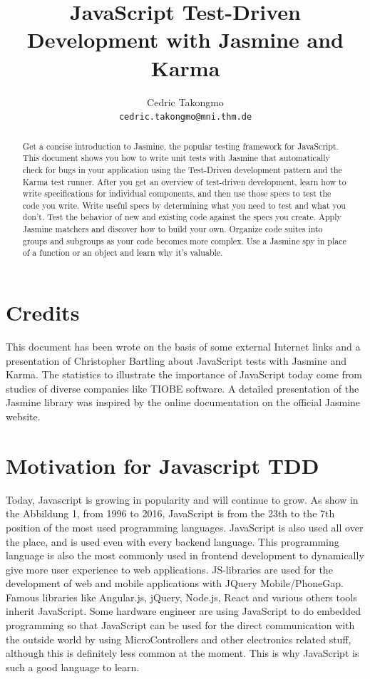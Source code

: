 \documentclass[11pt]{article}
\title{JavaScript Test-Driven Development with Jasmine and Karma}
\author{Cedric Takongmo \\
{\tt cedric.takongmo@mni.thm.de}}
\date{}
\begin{document}
\maketitle
\begin{abstract}
Get a concise introduction to Jasmine, the popular testing framework for JavaScript. This document shows you how to write unit tests with Jasmine that automatically check for bugs in your application using the Test-Driven development pattern and the Karma test runner. After you get an overview of test-driven development, learn how to write specifications for individual components, and then use those specs to test the code you write. Write useful specs by determining what you need to test and what you don’t. Test the behavior of new and existing code against the specs you create. Apply Jasmine matchers and discover how to build your own. Organize code suites into groups and subgroups as your code becomes more complex. Use a Jasmine spy in place of a function or an object and learn why it’s valuable.

\end{abstract}

\section{Credits}

This document has been wrote on the basis of some external Internet links and a presentation of Christopher Bartling about JavaScript tests with Jasmine and Karma. The statistics to illustrate the importance of JavaScript today come from studies of diverse companies like TIOBE software. A detailed presentation of the Jasmine library was inspired by the online documentation on the official Jasmine website. 

\section{Motivation for Javascript TDD}

Today, Javascript is growing in popularity and will continue to grow. As show in the Abbildung 1, from 1996 to 2016, JavaScript is from the 23th to the 7th position of the most used programming languages. JavaScript is also used all over the place, and is used even with every backend language. This programming language is also the most commonly used in frontend development to dynamically give more user experience to web applications. JS-libraries are used for the development of web and mobile applications with JQuery Mobile/PhoneGap. Famous libraries like Angular.js, jQuery, Node.js, React and various others tools inherit JavaScript. Some hardware engineer are using JavaScript to do embedded programming so that JavaScript can be used for the direct communication with the outside world by using MicroControllers and other electronics related stuff, although this is definitely less common at the moment. This is why JavaScript is such a good language to learn.
\end{document}

